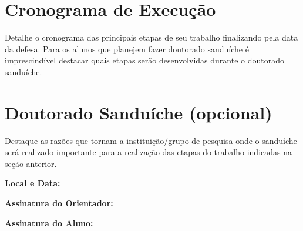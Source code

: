 \documentclass[12pt]{article}
\begin{document}
\section{Cronograma de Execução}
Detalhe o cronograma das principais etapas de seu trabalho finalizando pela data da defesa. Para os alunos que planejem fazer doutorado sanduíche é imprescindível destacar quais etapas serão desenvolvidas durante o doutorado sanduíche.

\section{Doutorado Sanduíche (opcional)}
Destaque as razões que tornam a instituição/grupo de pesquisa onde o sanduíche será realizado importante para a realização das etapas do trabalho indicadas na seção anterior.




\noindent \textbf{Local e Data:}

\noindent \textbf{Assinatura do Orientador:}

\noindent \textbf{Assinatura do Aluno:}
\end{document}

